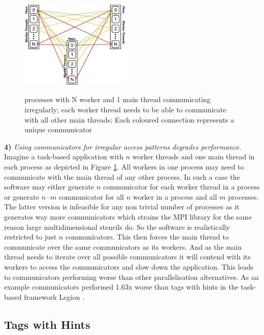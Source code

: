 \documentclass[sigconf]{acmart}
\begin{document}
\begin{figure}
    \caption{processes with N worker and 1 main thread communicating irregularly; each worker thread needs to be able to communicate with all other main threads; Each coloured connection represents a unique communicator}
    \includegraphics[width=0.47\textwidth]{Communicator_Irregular.png}
    \label{fig:Communicator_Irregular}
\end{figure}

\textbf{4)} \textit{Using communicators for irregular access patterns degrades performance.}
Imagine a task-based application with $n$ worker threads and one main thread in each process as depicted in Figure \ref{fig:Communicator_Irregular}.
All workers in one process may need to communicate with the main thread of any other process.
In such a case the software may either generate $n$ communicator for each worker thread in a process or generate $n \cdot m$ communicator for all $n$ worker in a process and all $m$ processes.
The latter version is infeasible for any non trivial number of processes as it generates way more communicators which strains the MPI library for the same reason large multidimensional stencils do.
So the software is realistically restricted to just $n$ communicators.
This then forces the main thread to communicate over the same communicators as its workers.
And as the main thread needs to iterate over all possible communicators it will contend with its workers to access the communicators and slow down the application.
This leads to communicators performing worse than other parallelisation alternatives.
As an example communicators performed 1.63x worse than tags with hints in the task-based framework Legion \cite{zambreLogicalParallel2021}.

\subsection{Tags with Hints}
\end{document}
